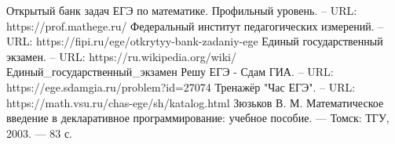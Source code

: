 \begin{thebibliography}{6}
	Открытый банк задач ЕГЭ по математике. Профильный уровень. – URL:  https://prof.mathege.ru/
	Федеральный институт педагогических измерений. – URL:  https://fipi.ru/ege/otkrytyy-bank-zadaniy-ege
	 Единый государственный экзамен. – URL:  https://ru.wikipedia.org/wiki/Единый\_государственный\_экзамен
	Решу ЕГЭ - Сдам ГИА. – URL: https://ege.sdamgia.ru/problem?id=27074
	 Тренажёр "Час ЕГЭ". – URL: https://math.vsu.ru/chas-ege/sh/katalog.html
	 Зюзьков В. М. Математическое введение в декларативное программирование: учебное пособие. — Томск: ТГУ, 2003. — 83 с. 
\end{thebibliography}